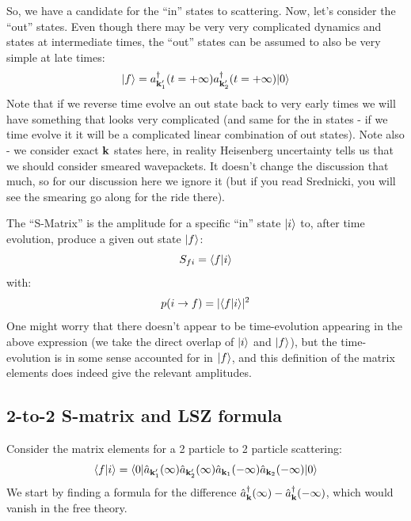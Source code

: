 So, we have a candidate for the ``in'' states to scattering. Now, let's consider the ``out'' states. Even though there may be very very complicated dynamics and states at intermediate times, the ``out'' states can be assumed to also be very simple at late times:
\begin{equation}
    \lvert f \rangle = a^\dagger_{\mathbf{k}_1'}(t=+\infty)a^\dagger_{\mathbf{k}_2'}(t=+\infty)\lvert 0 \rangle
\end{equation}
Note that if we reverse time evolve an out state back to very early times we will have something that looks very complicated (and same for the in states - if we time evolve it it will be a complicated linear combination of out states). Note also - we consider exact $\mathbf{k}$ states here, in reality Heisenberg uncertainty tells us that we should consider smeared wavepackets. It doesn't change the discussion that much, so for our discussion here we ignore it (but if you read Srednicki, you will see the smearing go along for the ride there).

The ``S-Matrix'' is the amplitude for a specific ``in'' state $\lvert i \rangle$ to, after time evolution, produce a given out state $\lvert f \rangle$:
\begin{equation}
    S_{fi} = \langle f \lvert i \rangle
\end{equation}
with:
\begin{equation}
    p(i \to f) = \lvert \langle f \lvert i \rangle \rvert^2
\end{equation}
One might worry that there doesn't appear to be time-evolution appearing in the above expression (we take the direct overlap of $\lvert i \rangle$ and $\lvert f \rangle$), but the time-evolution is in some sense accounted for in $\lvert f \rangle$, and this definition of the matrix elements does indeed give the relevant amplitudes.

\subsection{2-to-2 S-matrix and LSZ formula}
Consider the matrix elements for a 2 particle to 2 particle scattering:
\begin{equation}
    \langle f \lvert i \rangle = \langle 0 \rvert\hat{a}_{\mathbf{k}_1'}(\infty)\hat{a}_{\mathbf{k}_2'}(\infty)\hat{a}_{\mathbf{k}_1}(-\infty)\hat{a}_{\mathbf{k}_2}(-\infty)\lvert 0 \rangle
\end{equation}
We start by finding a formula for the difference $\hat{a}_{\mathbf{k}}^\dagger(\infty) - \hat{a}_{\mathbf{k}}^\dagger(-\infty)$, which would vanish in the free theory.


